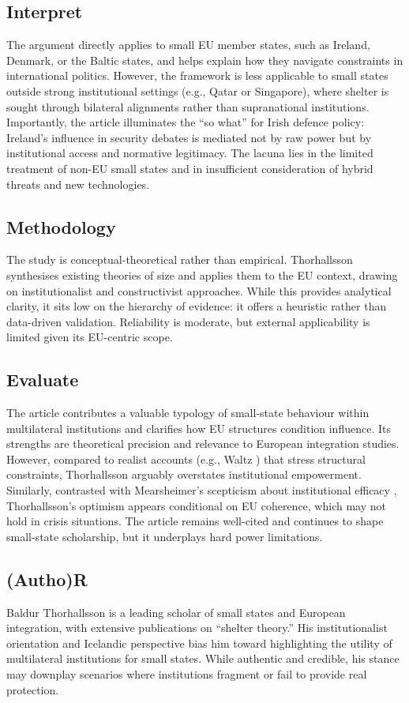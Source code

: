 \subsection*{Interpret}
The argument directly applies to small EU member states, such as Ireland, Denmark, or the Baltic states, and helps explain how they navigate constraints in international politics. However, the framework is less applicable to small states outside strong institutional settings (e.g., Qatar or Singapore), where shelter is sought through bilateral alignments rather than supranational institutions. Importantly, the article illuminates the “so what” for Irish defence policy: Ireland’s influence in security debates is mediated not by raw power but by institutional access and normative legitimacy. The lacuna lies in the limited treatment of non-EU small states and in insufficient consideration of hybrid threats and new technologies.

\subsection*{Methodology}
The study is conceptual-theoretical rather than empirical. Thorhallsson synthesises existing theories of size and applies them to the EU context, drawing on institutionalist and constructivist approaches. While this provides analytical clarity, it sits low on the hierarchy of evidence: it offers a heuristic rather than data-driven validation. Reliability is moderate, but external applicability is limited given its EU-centric scope.

\subsection*{Evaluate}
The article contributes a valuable typology of small-state behaviour within multilateral institutions and clarifies how EU structures condition influence. Its strengths are theoretical precision and relevance to European integration studies. However, compared to realist accounts (e.g., Waltz \parencite{WALTZ_1979}) that stress structural constraints, Thorhallsson arguably overstates institutional empowerment. Similarly, contrasted with Mearsheimer’s scepticism about institutional efficacy \parencite{MEARSHEIMER_1994}, Thorhallsson’s optimism appears conditional on EU coherence, which may not hold in crisis situations. The article remains well-cited and continues to shape small-state scholarship, but it underplays hard power limitations.

\subsection*{(Autho)R}
Baldur Thorhallsson is a leading scholar of small states and European integration, with extensive publications on “shelter theory.” His institutionalist orientation and Icelandic perspective bias him toward highlighting the utility of multilateral institutions for small states. While authentic and credible, his stance may downplay scenarios where institutions fragment or fail to provide real protection.

